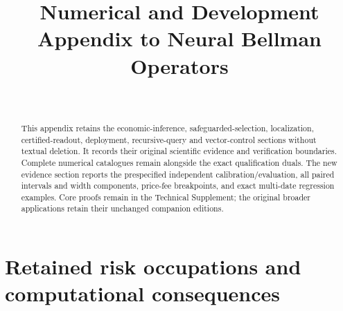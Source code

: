 \documentclass[ecta,nameyear,draft]{econsocart}
\begin{document}
\begin{frontmatter}
\title{Numerical and Development Appendix to Neural Bellman Operators}
\begin{aug}
\author[id=au1,addressref={add1}]{~}
\address[id=add1]{Peking University}
\end{aug}
\begin{abstract}
This appendix retains the economic-inference, safeguarded-selection, localization, certified-readout, deployment, recursive-query and vector-control sections without textual deletion. It records their original scientific evidence and verification boundaries. Complete numerical catalogues remain alongside the exact qualification duals. The new evidence section reports the prespecified independent calibration/evaluation, all paired intervals and width components, price-fee breakpoints, and exact multi-date regression examples. Core proofs remain in the Technical Supplement; the original broader applications retain their unchanged companion editions.
\end{abstract}
\end{frontmatter}
\appendix
\renewcommand{\thetheorem}{A.\arabic{theorem}}
\renewcommand{\theequation}{A.\arabic{equation}}
\renewcommand{\thesection}{\AlphAlph{\value{section}}}







\section{Retained risk occupations and computational consequences}\label{sec:riskextensions99}

\end{document}
